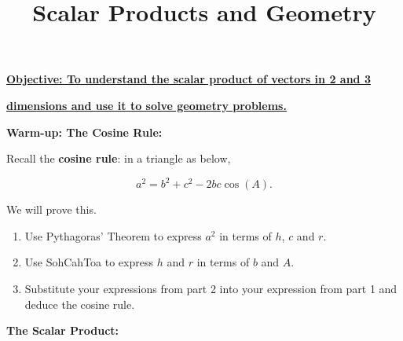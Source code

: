 \documentclass{article}
\begin{document}
\title{Scalar Products and Geometry}
\date{}

\maketitle
\thispagestyle{empty}

\Large

\textbf{\underline{Objective: To understand the scalar product of vectors in 2 and 3}}

\textbf{\underline{dimensions and use it to solve geometry problems.}}



\vspace{5mm}



\textbf{Warm-up: The Cosine Rule:}\bigskip



Recall the \textbf{cosine rule}: in a triangle as below,
\begin{center}
\end{center}
\[a^2=b^2+c^2-2bc\cos(A).\]

We will prove this.\bigskip



\begin{enumerate}
	\item Use Pythagoras' Theorem to express $a^2$ in terms of $h$, $c$ and $r$. %
	\item Use SohCahToa to express $h$ and $r$ in terms of $b$ and $A$. %
	\item Substitute your expressions from part 2 into your expression from part 1 and deduce the cosine rule. %
\end{enumerate}




\clearpage

\textbf{The Scalar Product:}\bigskip
\end{document}
